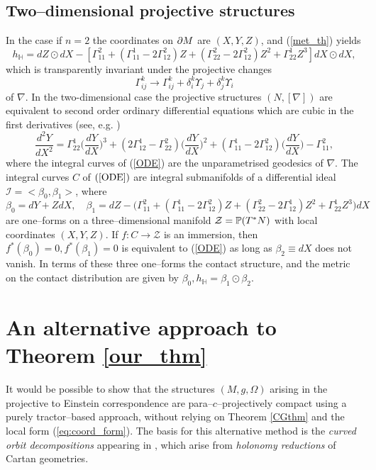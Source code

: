 \subsection{Two--dimensional projective structures}
In the case if $n=2$ the coordinates on $\partial M$ are $(X, Y, Z)$,  and (\ref{met_th}) yields
\[
h_{ \mathbb{H} }=dZ\odot dX-[\Gamma_{11}^2+(\Gamma_{11}^1-2\Gamma_{12}^2)Z+(\Gamma_{22}^2-2\Gamma_{12}^2)Z^2+
\Gamma_{22}^1Z^3]dX\odot dX,
\]
which is transparently invariant under the projective changes 
\[
\Gamma_{ij}^k\longrightarrow \Gamma_{ij}^k+\delta^k_i\Upsilon_j+\delta^k_j\Upsilon_i
\]
of $\nabla$.
In the  two-dimensional case the 
projective
structures $(N, [\nabla])$ are equivalent to second order ordinary differential equations which are cubic in
the first derivatives (see, e.g. \cite{BDE})
\begin{equation}
\label{ODE}
\frac{d^2 Y}{d X^2}=\Gamma^1_{22}\Big(\frac{d Y}{d X}\Big)^3
+(2\Gamma^1_{12}-\Gamma^2_{22})\Big(\frac{d Y}{d X}\Big)^2
+(\Gamma^1_{11}-2\Gamma^2_{12})\Big(\frac{d Y}{d X}\Big)-
\Gamma^2_{11},
\end{equation}
where the integral curves of (\ref{ODE}) are the unparametrised geodesics of $\nabla$. 
The integral curves $C$ of $(\ref{ODE})$ are integral submanifolds
of a  differential
ideal ${\mathcal I}=<\beta_0, \beta_1>$, where
\[
\beta_0=dY+ZdX, \quad \beta_1=dZ-\Big(\Gamma_{11}^2+(\Gamma_{11}^1-2\Gamma_{12}^2)Z+(\Gamma_{22}^2-2\Gamma_{12}^1)Z^2+
\Gamma_{22}^1Z^3\Big)dX
\]
are one--forms on a three--dimensional manifold $\mathcal{Z}=\mathbb{P}(T^*N)$ with local coordinates $(X, Y, Z)$. If $f:C\rightarrow \mathcal{Z}$ is an immersion, then $f^*(\beta_0)=0, f^*(\beta_1)=0$ is equivalent
to (\ref{ODE}) as long as $\beta_2\equiv dX$ does not vanish. In terms of these three one--forms
the contact structure, and the metric on the contact distribution are given by
$
\beta_0,  h_{ \mathbb{H} }=\beta_1\odot\beta_2.
$

\section{An alternative approach to Theorem \ref{our_thm}}

It would be possible to show that the structures $(M,g,\Omega)$ arising in the projective to Einstein correspondence are para--$c$--projectively compact using a purely tractor--based approach, without relying on Theorem \ref{CGthm} and the local form (\ref{eq:coord_form}). The basis for this alternative method is the \textit{curved orbit decompositions} appearing in \cite{CGH-duke}, which arise from \textit{holonomy reductions} of Cartan geometries.

